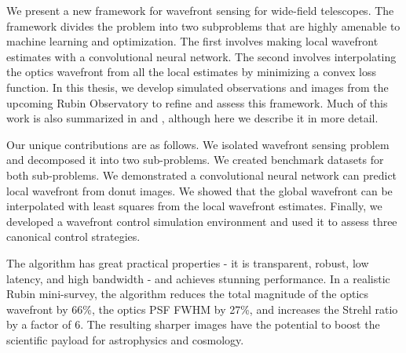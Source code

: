 We present a new framework for wavefront sensing for wide-field telescopes. The framework divides the problem into two subproblems that are highly amenable to machine learning and optimization. The first involves making local wavefront estimates with a convolutional neural network. The second involves interpolating the optics wavefront from all the local estimates by minimizing a convex loss function. In this thesis, we develop simulated observations and images from the upcoming Rubin Observatory to refine and assess this framework. Much of this work is also summarized in \cite{2020SPIE11448E..4HT} and \cite{9523024}, although here we describe it in more detail. 

Our unique contributions are as follows. We isolated wavefront sensing problem and decomposed it into two sub-problems. We created benchmark datasets for both sub-problems. We demonstrated a convolutional neural network can predict local wavefront from donut images. We showed that the global wavefront can be interpolated with least squares from the local wavefront estimates. Finally, we developed a wavefront control simulation environment and used it to assess three canonical control strategies.

The algorithm has great practical properties - it is transparent, robust, low latency, and high bandwidth - and achieves stunning performance. In a realistic Rubin mini-survey, the algorithm reduces the total magnitude of the optics wavefront by 66\%, the optics PSF FWHM by 27\%, and increases the Strehl ratio by a factor of 6. The resulting sharper images have the potential to boost the scientific payload for astrophysics and cosmology.